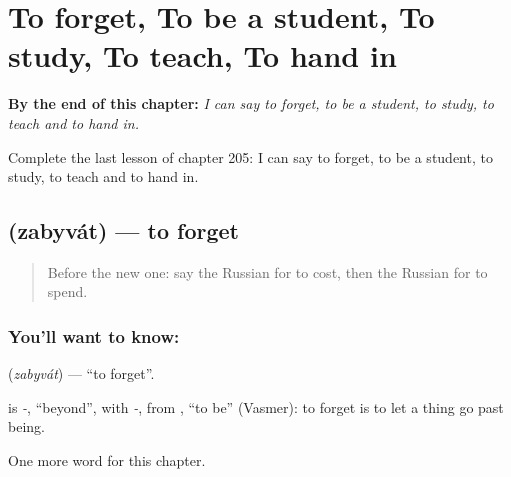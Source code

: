 
\chapter{To forget, To be a student, To study, To teach, To hand in}
\label{ch:ru-to-forget-to-be-a-student-to-study-to-teach-to-hand-in}

\begin{chapteropening}
\textbf{By the end of this chapter:} \emph{I can say to forget, to be a student, to study, to teach and to hand in.}

Complete the last lesson of chapter 205: I can say to forget, to be a student, to study, to teach and to hand in.
\end{chapteropening}

\section[\texorpdfstring{\ru{забывать} (zabyvát)}{забывать (zabyvát)}]{ (zabyvát) — to forget}

\label{lesson:RU-C205-zabyvat}



\begin{quote}
Before the new one: say the Russian for to cost, then the Russian for to spend.
\end{quote}

\subsection*{You'll want to know: }
\textbf{} (\emph{zabyvát}) — \textquotedblleft{}to forget\textquotedblright{}.

\begin{cousinweb}
\textbf{} is \emph{-}, \textquotedblleft{}beyond\textquotedblright{}, with \emph{-}, from \emph{}, \textquotedblleft{}to be\textquotedblright{} (Vasmer): to forget is to let a thing go past being.
\end{cousinweb}

\begin{grammarlens}[title={What you've built}]
One more word for this chapter.
\end{grammarlens}

